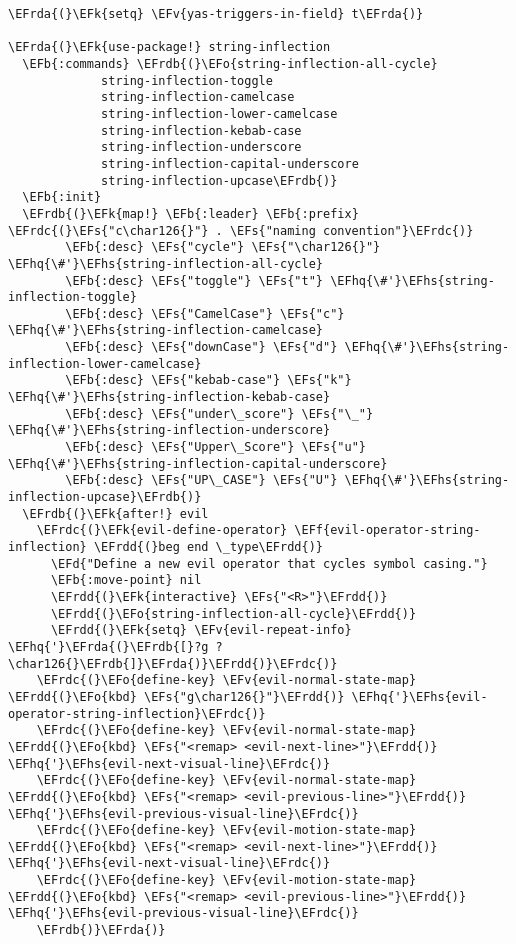 \documentclass[a4wide,10pt]{article}
\newcommand{\EFs}[1]{\textcolor{EFs}{#1}} %
\newcommand{\EFd}[1]{\textcolor{EFd}{#1}} %
\newcommand{\EFk}[1]{\textcolor{EFk}{#1}} %
\newcommand{\EFb}[1]{\textcolor{EFb}{#1}} %
\newcommand{\EFf}[1]{\textcolor{EFf}{#1}} %
\newcommand{\EFv}[1]{\textcolor{EFv}{#1}} %
\newcommand{\EFo}[1]{\textcolor{EFo}{#1}} %
\newcommand{\EFhq}[1]{\textcolor{EFhq}{#1}} %
\newcommand{\EFhs}[1]{\textcolor{EFhs}{#1}} %
\newcommand{\EFrda}[1]{\textcolor{EFrda}{#1}} %
\newcommand{\EFrdb}[1]{\textcolor{EFrdb}{#1}} %
\newcommand{\EFrdc}[1]{\textcolor{EFrdc}{#1}} %
\newcommand{\EFrdd}[1]{\textcolor{EFrdd}{#1}} %
\begin{document}
\begin{Code}
\begin{Verbatim}
\EFrda{(}\EFk{setq} \EFv{yas-triggers-in-field} t\EFrda{)}

\EFrda{(}\EFk{use-package!} string-inflection
  \EFb{:commands} \EFrdb{(}\EFo{string-inflection-all-cycle}
             string-inflection-toggle
             string-inflection-camelcase
             string-inflection-lower-camelcase
             string-inflection-kebab-case
             string-inflection-underscore
             string-inflection-capital-underscore
             string-inflection-upcase\EFrdb{)}
  \EFb{:init}
  \EFrdb{(}\EFk{map!} \EFb{:leader} \EFb{:prefix} \EFrdc{(}\EFs{"c\char126{}"} . \EFs{"naming convention"}\EFrdc{)}
        \EFb{:desc} \EFs{"cycle"} \EFs{"\char126{}"} \EFhq{\#'}\EFhs{string-inflection-all-cycle}
        \EFb{:desc} \EFs{"toggle"} \EFs{"t"} \EFhq{\#'}\EFhs{string-inflection-toggle}
        \EFb{:desc} \EFs{"CamelCase"} \EFs{"c"} \EFhq{\#'}\EFhs{string-inflection-camelcase}
        \EFb{:desc} \EFs{"downCase"} \EFs{"d"} \EFhq{\#'}\EFhs{string-inflection-lower-camelcase}
        \EFb{:desc} \EFs{"kebab-case"} \EFs{"k"} \EFhq{\#'}\EFhs{string-inflection-kebab-case}
        \EFb{:desc} \EFs{"under\_score"} \EFs{"\_"} \EFhq{\#'}\EFhs{string-inflection-underscore}
        \EFb{:desc} \EFs{"Upper\_Score"} \EFs{"u"} \EFhq{\#'}\EFhs{string-inflection-capital-underscore}
        \EFb{:desc} \EFs{"UP\_CASE"} \EFs{"U"} \EFhq{\#'}\EFhs{string-inflection-upcase}\EFrdb{)}
  \EFrdb{(}\EFk{after!} evil
    \EFrdc{(}\EFk{evil-define-operator} \EFf{evil-operator-string-inflection} \EFrdd{(}beg end \_type\EFrdd{)}
      \EFd{"Define a new evil operator that cycles symbol casing."}
      \EFb{:move-point} nil
      \EFrdd{(}\EFk{interactive} \EFs{"<R>"}\EFrdd{)}
      \EFrdd{(}\EFo{string-inflection-all-cycle}\EFrdd{)}
      \EFrdd{(}\EFk{setq} \EFv{evil-repeat-info} \EFhq{'}\EFrda{(}\EFrdb{[}?g ?\char126{}\EFrdb{]}\EFrda{)}\EFrdd{)}\EFrdc{)}
    \EFrdc{(}\EFo{define-key} \EFv{evil-normal-state-map} \EFrdd{(}\EFo{kbd} \EFs{"g\char126{}"}\EFrdd{)} \EFhq{'}\EFhs{evil-operator-string-inflection}\EFrdc{)}
    \EFrdc{(}\EFo{define-key} \EFv{evil-normal-state-map} \EFrdd{(}\EFo{kbd} \EFs{"<remap> <evil-next-line>"}\EFrdd{)} \EFhq{'}\EFhs{evil-next-visual-line}\EFrdc{)}
    \EFrdc{(}\EFo{define-key} \EFv{evil-normal-state-map} \EFrdd{(}\EFo{kbd} \EFs{"<remap> <evil-previous-line>"}\EFrdd{)} \EFhq{'}\EFhs{evil-previous-visual-line}\EFrdc{)}
    \EFrdc{(}\EFo{define-key} \EFv{evil-motion-state-map} \EFrdd{(}\EFo{kbd} \EFs{"<remap> <evil-next-line>"}\EFrdd{)} \EFhq{'}\EFhs{evil-next-visual-line}\EFrdc{)}
    \EFrdc{(}\EFo{define-key} \EFv{evil-motion-state-map} \EFrdd{(}\EFo{kbd} \EFs{"<remap> <evil-previous-line>"}\EFrdd{)} \EFhq{'}\EFhs{evil-previous-visual-line}\EFrdc{)}
    \EFrdb{)}\EFrda{)}


\end{Verbatim}
\end{Code}
\end{document}
